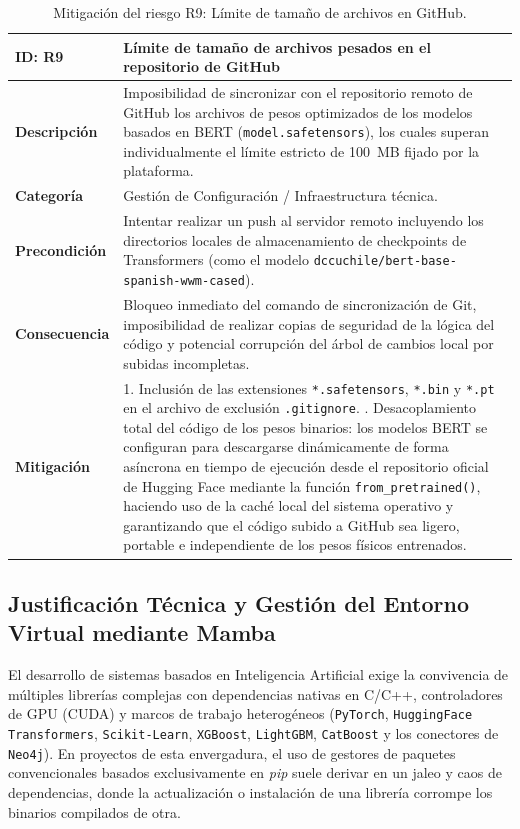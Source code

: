 \documentclass[12pt,a4paper,onecolumn,oneside]{report}
\begin{document}
\begin{table}[htbp]
\centering
\small
\begin{tabular}{|p{2.5cm}|p{10.5cm}|}
\hline
\rowcolor[RGB]{230,230,230} \textbf{ID: R9} & \textbf{Límite de tamaño de archivos pesados en el repositorio de GitHub} \\ \hline
\textbf{Descripción} & Imposibilidad de sincronizar con el repositorio remoto de GitHub los archivos de pesos optimizados de los modelos basados en BERT (\texttt{model.safetensors}), los cuales superan individualmente el límite estricto de 100~MB fijado por la plataforma. \\ \hline
\textbf{Categoría} & Gestión de Configuración / Infraestructura técnica. \\ \hline
\textbf{Precondición} & Intentar realizar un push al servidor remoto incluyendo los directorios locales de almacenamiento de checkpoints de Transformers (como el modelo \texttt{dccuchile/bert-base-spanish-wwm-cased}). \\ \hline
\textbf{Consecuencia} & Bloqueo inmediato del comando de sincronización de Git, imposibilidad de realizar copias de seguridad de la lógica del código y potencial corrupción del árbol de cambios local por subidas incompletas. \\ \hline
\textbf{Mitigación} & 
1. Inclusión de las extensiones \texttt{*.safetensors}, \texttt{*.bin} y \texttt{*.pt} en el archivo de exclusión \texttt{.gitignore}. \newline
2. Desacoplamiento total del código de los pesos binarios: los modelos BERT se configuran para descargarse dinámicamente de forma asíncrona en tiempo de ejecución desde el repositorio oficial de Hugging Face mediante la función \texttt{from\_pretrained()}, haciendo uso de la caché local del sistema operativo y garantizando que el código subido a GitHub sea ligero, portable e independiente de los pesos físicos entrenados. \\ \hline
\end{tabular}
\label{tab:R9}
\caption{Mitigación del riesgo R9: Límite de tamaño de archivos en GitHub.}
\end{table}
\clearpage

\subsection{Justificación Técnica y Gestión del Entorno Virtual mediante Mamba}
\label{subsec:justificacion_mamba}

El desarrollo de sistemas basados en Inteligencia Artificial  exige la convivencia de múltiples librerías complejas con dependencias nativas en C/C++, controladores de GPU (CUDA) y marcos de trabajo heterogéneos (\texttt{PyTorch}, \texttt{HuggingFace Transformers}, \texttt{Scikit-Learn}, \texttt{XGBoost}, \texttt{LightGBM}, \texttt{CatBoost} y los conectores de \texttt{Neo4j}). En proyectos de esta envergadura, el uso de gestores de paquetes convencionales basados exclusivamente en \textit{pip} suele derivar en un jaleo y caos de dependencias, donde la actualización o instalación de una librería corrompe los binarios compilados de otra.
\end{document}
